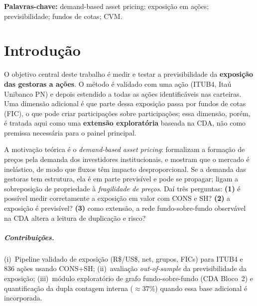 \documentclass[12pt,a4paper]{report}
\begin{document}
\noindent\textbf{Palavras-chave:} demand-based asset pricing; exposição em ações; previsibilidade; fundos de
cotas; CVM.

\tableofcontents

\chapter{Introdução}\label{cap:intro}
O objetivo central deste trabalho é medir e testar a previsibilidade da \textbf{exposição das gestoras a
ações}. O método é validado com uma ação (ITUB4, Itaú Unibanco PN) e depois estendido a todas as ações
identificáveis nas carteiras. Uma dimensão adicional é que parte dessa exposição passa por fundos de cotas
(FIC), o que pode criar participações sobre participações; essa dimensão, porém, é tratada aqui como uma
\textbf{extensão exploratória} baseada na CDA, não como premissa necessária para o painel principal.

A motivação teórica é o \emph{demand-based asset pricing}: \citet{koijenyogo2019} formalizam a formação de
preços pela demanda dos investidores institucionais, e \citet{gabaixkoijen2021} mostram que o mercado é
inelástico, de modo que fluxos têm impacto desproporcional. Se a demanda das gestoras tem estrutura, ela é
em parte previsível e pode se propagar; \citet{greenwoodthesmar2011} ligam a sobreposição de propriedade à
\emph{fragilidade de preços}. Daí três perguntas: \textbf{(1)} é possível medir corretamente a exposição em
valor com CONS e SH? \textbf{(2)} a exposição é previsível? \textbf{(3)} como extensão, a rede
fundo-sobre-fundo observável na CDA altera a leitura de duplicação e risco?

\paragraph{Contribuições.} (i)~Pipeline validado de exposição (R\$/US\$, net, grupos, FICs) para ITUB4 e
836 ações usando CONS+SH; (ii)~avaliação \emph{out-of-sample} da previsibilidade da exposição; (iii)~módulo
exploratório de grafo fundo-sobre-fundo (CDA Bloco~2) e quantificação da dupla contagem interna
($\approx 37\%$) quando essa base adicional é incorporada.

\end{document}
